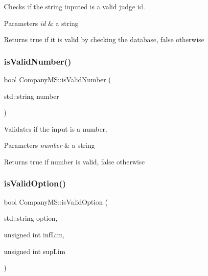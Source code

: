 Checks if the string inputed is a valid judge id. 


\begin{DoxyParams}{Parameters}
{\em id} & a string \\
\hline
\end{DoxyParams}
\begin{DoxyReturn}{Returns}
true if it is valid by checking the database, false otherwise 
\end{DoxyReturn}
\mbox{\label{class_company_m_s_a3536b19cdf6f981d44f0fc2a6ff6446b}} 
\subsubsection{\texorpdfstring{is\+Valid\+Number()}{isValidNumber()}}
{\footnotesize\ttfamily bool Company\+M\+S\+::is\+Valid\+Number (\begin{DoxyParamCaption}\item[{std\+::string}]{number }\end{DoxyParamCaption})}



Validates if the input is a number. 


\begin{DoxyParams}{Parameters}
{\em number} & a string \\
\hline
\end{DoxyParams}
\begin{DoxyReturn}{Returns}
true if number is valid, false otherwise 
\end{DoxyReturn}
\mbox{\label{class_company_m_s_a396a97beace49c2ba9906cc3c65c337b}} 
\subsubsection{\texorpdfstring{is\+Valid\+Option()}{isValidOption()}}
{\footnotesize\ttfamily bool Company\+M\+S\+::is\+Valid\+Option (\begin{DoxyParamCaption}\item[{std\+::string}]{option,  }\item[{unsigned int}]{inf\+Lim,  }\item[{unsigned int}]{sup\+Lim }\end{DoxyParamCaption})}



